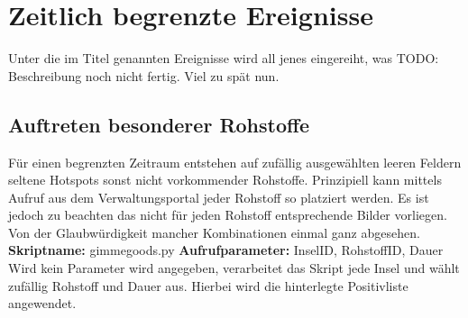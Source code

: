\chapter{Zeitlich begrenzte Ereignisse}
Unter die im Titel genannten Ereignisse wird all jenes eingereiht, was \newline
TODO: Beschreibung noch nicht fertig. Viel zu sp{\"a}t nun.

\section {Auftreten besonderer Rohstoffe}
F{\"u}r einen begrenzten Zeitraum entstehen auf zuf{\"a}llig ausgew{\"a}hlten
leeren Feldern seltene Hotspots sonst nicht vorkommender Rohstoffe. Prinzipiell
kann mittels Aufruf aus dem Verwaltungsportal jeder Rohstoff so platziert
werden. Es ist jedoch zu beachten das nicht f{\"u}r jeden Rohstoff entsprechende
Bilder vorliegen. Von der Glaubw{\"u}rdigkeit mancher Kombinationen einmal ganz
abgesehen.
\newline\newline \textbf{Skriptname:} gimmegoods.py \newline\newline
\textbf{Aufrufparameter:} InselID, RohstoffID, Dauer
\newline\newline
Wird kein Parameter wird angegeben, verarbeitet das Skript jede Insel und
w{\"a}hlt zuf{\"a}llig Rohstoff und Dauer aus. Hierbei wird die hinterlegte
Positivliste angewendet.

